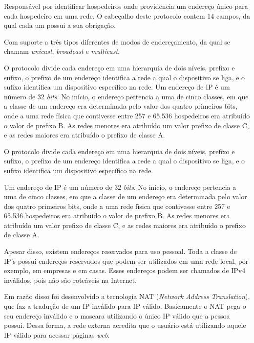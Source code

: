 Responsável por identificar hospedeiros onde providencia um endereço único para cada hospedeiro em uma rede. O cabeçalho deste protocolo contem 14 campos, da qual cada um possui a sua obrigação.

Com suporte a três tipos diferentes de modos de endereçamento, da qual se chamam \textit{unicast}, \textit{broadcast} e \textit{multicast}.

O protocolo divide cada endereço em uma hierarquia de dois níveis, prefixo e sufixo, o prefixo de um endereço identifica a rede a qual o dispositivo se liga, e o sufixo identifica um dispositivo específico na rede. Um endereço de IP é um número de 32 \textit{bits}. No início, o endereço pertencia a uma de cinco classes, em que a classe de um endereço era determinada pelo valor dos quatro primeiros bits, onde a uma rede física que contivesse entre 257 e 65.536 hospedeiros era atribuído o valor de prefixo B. As redes menores era atribuído um valor prefixo de classe C, e as redes maiores era atribuído o prefixo de classe A. %

O protocolo divide cada endereço em uma hierarquia de dois níveis, prefixo e sufixo, o prefixo de um endereço identifica a rede a qual o dispositivo se liga, e o sufixo identifica um dispositivo específico na rede.

Um endereço de IP é um número de 32 \textit{bits}. No início, o endereço pertencia a uma de cinco classes, em que a classe de um endereço era determinada pelo valor dos quatro primeiros bits, onde a uma rede física que contivesse entre 257 e 65.536 hospedeiros era atribuído o valor de prefixo B. As redes menores era atribuído um valor prefixo de classe C, e as redes maiores era atribuído o prefixo de classe A. %

Apesar disso, existem endereços reservados para uso pessoal. Toda a classe de IP's possui endereços reservados que podem ser utilizados em uma rede local, por exemplo, em empresas e em casas. Esses endereços podem ser chamados de IPv4 inválidos, pois não são roteáveis na Internet.

Em razão disso foi desenvolvido a tecnologia NAT (\textit{Network Address Translation}), que faz a tradução de um IP inválido para IP válido. Basicamente o NAT  pega o seu endereço inválido e o mascara utilizando o único IP válido que a pessoa possui. Dessa forma, a rede externa acredita que o usuário está utilizando aquele IP válido para acessar páginas \textit{web}.

